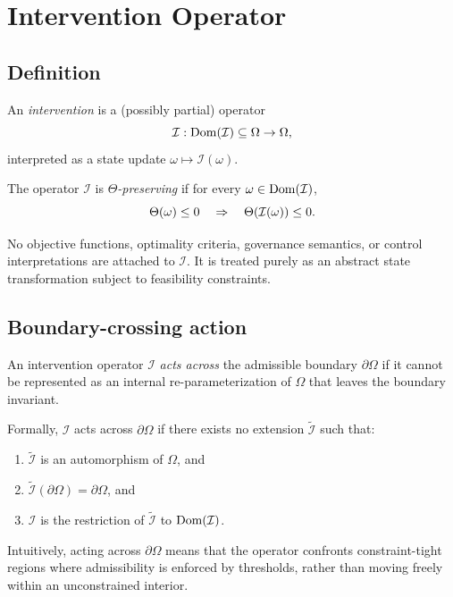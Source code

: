﻿\section{Intervention Operator}

\subsection{Definition}

\begin{definition}
An \emph{intervention} is a (possibly partial) operator
\[
\mathcal{I}:\operatorname{Dom}(\mathcal{I})\subseteq \Omega \to \Omega,
\]
interpreted as a state update $\omega \mapsto \mathcal{I}(\omega)$.

The operator $\mathcal{I}$ is \emph{$\Theta$-preserving} if for every
$\omega\in\operatorname{Dom}(\mathcal{I})$,
\[
\Theta(\omega)\le 0
\quad \Rightarrow \quad
\Theta(\mathcal{I}(\omega))\le 0.
\]
\end{definition}

No objective functions, optimality criteria, governance semantics, or control
interpretations are attached to $\mathcal{I}$.
It is treated purely as an abstract state transformation subject to feasibility
constraints.

\subsection{Boundary-crossing action}

\begin{definition}
An intervention operator $\mathcal{I}$ \emph{acts across} the admissible boundary
$\partial\Omega$ if it cannot be represented as an internal re-parameterization
of $\Omega$ that leaves the boundary invariant.

Formally, $\mathcal{I}$ acts across $\partial\Omega$ if there exists no extension
$\tilde{\mathcal{I}}$ such that:
\begin{enumerate}
\item $\tilde{\mathcal{I}}$ is an automorphism of $\Omega$, and
\item $\tilde{\mathcal{I}}(\partial\Omega)=\partial\Omega$, and
\item $\mathcal{I}$ is the restriction of $\tilde{\mathcal{I}}$ to
$\operatorname{Dom}(\mathcal{I})$.
\end{enumerate}
\end{definition}

Intuitively, acting across $\partial\Omega$ means that the operator confronts
constraint-tight regions where admissibility is enforced by thresholds, rather
than moving freely within an unconstrained interior.

